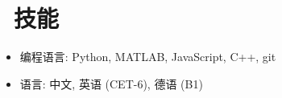 \documentclass{resume}
\begin{document}




\section{\faCogs\ 技能}
\begin{itemize}[parsep=0.5ex]
  \item 编程语言: Python, MATLAB, JavaScript, C++, git
  \item 语言: 中文, 英语 (CET-6), 德语 (B1)
  
\end{itemize}


%
%
\end{document}
